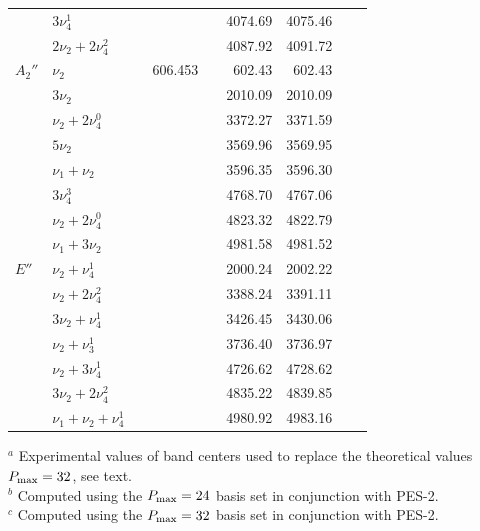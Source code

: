 \documentclass{achemso}
\newcommand{\3}{$_{3}$}
\newcommand{\onlinecite}[1]{\citenum{#1}}
\begin{document}
\begin{table}
\begin{center}
\begin{tabular}{llcr@{}lrrr@{}l}
        &	$	3\nu_4^1	        $	&	                &		        &	&	4074.69	&	4075.46	&	\\
        &	$	2\nu_2+2\nu_4^2	        $	&	                &		        &	&	4087.92	&	4091.72	&	\\
$A_2''$	&	$        \nu_2                  $       & \onlinecite{nu1_92}	& 606.453	        &	&	602.43	&	602.43  &	\\
      	&	$       3\nu_2                  $       & 	                & 	                &	&	2010.09	&	2010.09 &	\\
      	&	$        \nu_2+2\nu_4^0         $       & 	                & 	                &	&       3372.27	&	3371.59 &	\\
      	&	$       5\nu_2                  $       & 	                & 	                &	&	3569.96	&	3569.95 &	\\
        &	$        \nu_1+\nu_2            $       & 	                & 	                &	&	3596.35	&	3596.30 &	\\
        &       $       3\nu_4^3                $       & 	                & 	                &	&	4768.70	&	4767.06 &	\\
        &	$        \nu_2+2\nu_4^0         $       & 	                & 	                &	&	4823.32	&	4822.79 &	\\
        &	$        \nu_1+3\nu_2           $       & 	                & 	                &	&	4981.58	&	4981.52 &	\\
$E''$	&	$	 \nu_2+\nu_4^1	        $	&	                &		        &	&	2000.24	&	2002.22	&	\\
        &	$	 \nu_2+2\nu_4^2	        $	&	                &		        &	&	3388.24	&	3391.11	&	\\
        &	$	3\nu_2+\nu_4^1	        $	&	                &		        &	&	3426.45	&	3430.06	&	\\
        &	$	 \nu_2+\nu_3^1	        $	&	                &		        &	&	3736.40	&	3736.97	&	\\
        &	$	 \nu_2+3\nu_4^1	        $	&	                &		        &	&	4726.62	&	4728.62	&	\\
        &	$	3\nu_2+2\nu_4^2	        $	&	                &		        &	&	4835.22	&	4839.85	&	\\
        &	$	 \nu_1+\nu_2+\nu_4^1	$	&	                &		        &	&       4980.92	&	4983.16	&	\\
\hline
\end{tabular}
\end{center}
\begin{flushleft}
\noindent \vspace*{0.1truecm}
$^a$ Experimental values of band centers used to replace the theoretical values $P_{\rm max}=32$, see text.  \\
$^b$ Computed using the $P_{\rm max}=24$ basis set in conjunction with PES-2\cite{aa15}.\\
$^c$ Computed using the $P_{\rm max}=32$ basis set in conjunction with PES-2\cite{aa15}. \\
\end{flushleft}
\end{table}
\end{document}
